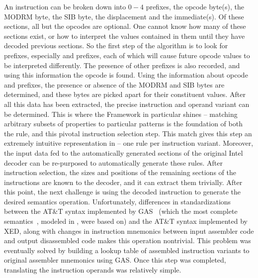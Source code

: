 An \GENISA instruction can be broken down into $0-4$ prefixes, the opcode byte(s), the MODRM byte, the SIB byte, the displacement and the immediate(s).  Of these sections, all but the opcodes are optional.  One cannot know how many of these sections exist, or how to interpret the values contained in them until they have decoded previous sections.  So the first step of the algorithm is to look for prefixes, especially  and  prefixes, each of which will cause future opcode values to be interpreted differently.  The presence of other prefixes is also recorded, and using this information the opcode is found.  Using the information about opcode and prefixes, the presence or absence of the MODRM and SIB bytes are determined, and these bytes are picked apart for their constituent values.  After all this data has been extracted, the precise instruction and operand variant can be determined.  This is where the \K Framework in particular shines – matching arbitrary subsets of properties to particular patterns is the foundation of both the \K rule, and this pivotal instruction selection step.  This match gives this step an extremely intuitive representation in \K – one rule per instruction variant.  Moreover, the input data fed to the automatically generated sections of the original Intel decoder can be re-purposed to automatically generate these \K rules.  After instruction selection, the sizes and positions of the remaining sections of the instructions are known to the decoder, and it can extract them trivially.  After this point, the next challenge is using the decoded instruction to generate the desired semantics operation.  Unfortunately, differences in standardizations between the AT\&T syntax implemented by GAS~\cite{gas} (which the most complete \ISA semantics~\cite{Dasgupta:2019}, modeled in \K, were based on) and the AT\&T syntax implemented by XED, along with changes in instruction mnemonics between input assembler code and output disassembled code makes this operation nontrivial.  This problem was eventually solved by building a lookup table of assembled instruction variants to original assembler mnemonics using GAS.  Once this step was completed, translating the instruction operands was relatively simple.

